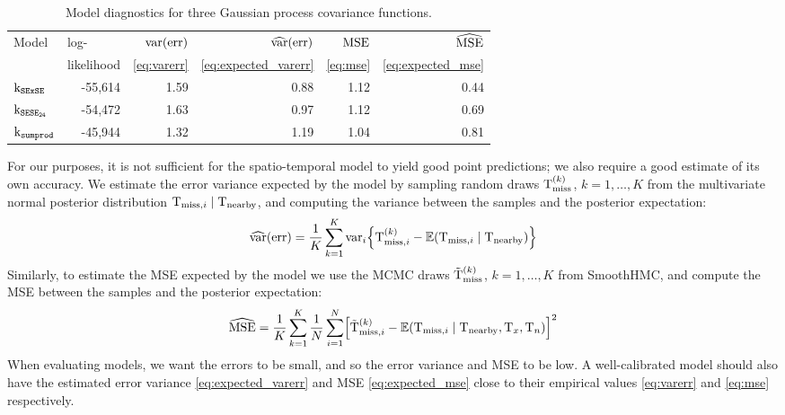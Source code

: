 \begin{table}[tbp]
\begin{center}
\bgroup
\def\arraystretch{1.1}%
\begin{tabular}{lrrrrr}
\hline
Model & \multicolumn{1}{l}{log-} & \(\operatorname{{var}}(\mathrm{err})\) & \(\widehat{\operatorname{{var}}}(\mathrm{err})\) & \(\operatorname{{MSE}}\) & \(\widehat{\operatorname{{MSE}}}\) \\
& \multicolumn{1}{l}{likelihood} & \multicolumn{1}{c}{\autoref{eq:varerr}} & \multicolumn{1}{c}{\autoref{eq:expected_varerr}} & \multicolumn{1}{c}{\autoref{eq:mse}} & \multicolumn{1}{c}{\autoref{eq:expected_mse}} \\
\hline
\(\operatorname{k_{\mathtt{SExSE}}}\) & -55,614 & 1.59 & 0.88 & 1.12 & 0.44\\
\(\operatorname{k_{\mathtt{SESE_{24}}}}\) & -54,472 & 1.63 & 0.97 & 1.12 & 0.69\\
\(\operatorname{k_{\mathtt{sumprod}}}\) & -45,944 & 1.32 & 1.19 & 1.04 & 0.81\\
\hline
\end{tabular}
\caption{
    Model diagnostics for three Gaussian process covariance functions. 
    \label{table:diagnostics}
}
\egroup
\end{center}
\end{table}

For our purposes, it is not sufficient for the spatio-temporal model to yield good point predictions; we also require a good estimate of its own accuracy.
We estimate the error variance expected by the model by sampling random draws \(\mathrm{T}^{(k)}_{\mathrm{miss}}\), \(k=1,\dotsc,K\) from the multivariate normal posterior distribution \(\mathrm{T}_{\mathrm{miss},i} \mid \mathrm{T}_{\mathrm{nearby}}\), and computing the variance between the samples and the posterior expectation:
\begin{equation}
\widehat{\var}\del{\error} = \frac{1}{K} \sum_{k=1}^K \var_i \cbr{\Temp^{(k)}_{\miss,i} - \E\del{\Temp_{\miss,i} \mid \Temp_\obs}}
\label{eq:expected_varerr}
\end{equation}
Similarly, to estimate the MSE expected by the model we use the MCMC draws \(\tilde{\mathrm{T}}^{(k)}_{\mathrm{miss}}\), \(k=1,\dotsc,K\) from SmoothHMC, and compute the MSE between the samples and the posterior expectation:
\begin{equation}
    \widehat{\mse} = \frac{1}{K} \sum_{k=1}^K \frac{1}{N} \sum_{i=1}^N \sbr{\tilde\Temp^{(k)}_{\miss,i} - \E\del{\Temp_{\miss,i} \mid \Temp_\obs,\Tx,\Tn}}^2
\label{eq:expected_mse}
\end{equation}
When evaluating models, we want the errors to be small, and so the error variance and MSE to be low. 
A well-calibrated model should also have the estimated error variance \autoref{eq:expected_varerr} and MSE \autoref{eq:expected_mse} close to their empirical values \autoref{eq:varerr} and \autoref{eq:mse} respectively.

